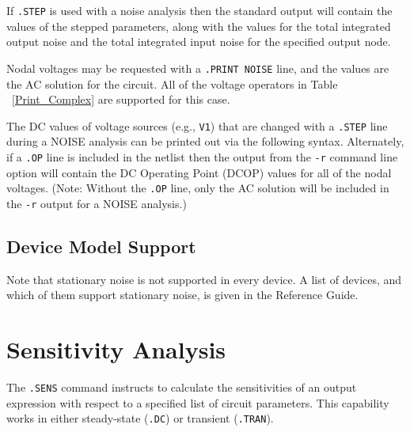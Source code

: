 If \texttt{.STEP} is used with a noise analysis then the \Xyce{} standard output
will contain the values of the stepped parameters, along with the values
for the total integrated output noise and the total integrated input 
noise for the specified output node.

Nodal voltages may be requested with a \verb|.PRINT NOISE| line, and the values 
are the AC solution for the circuit.  All of the voltage operators in 
Table ~\ref{Print_Complex} are supported for this case.

The DC values of voltage sources (e.g., \texttt{V1}) that are changed with 
a \verb|.STEP| line during a NOISE analysis can be printed out via the
following syntax. Alternately, if a \verb|.OP| line is included in the 
netlist then the output from the \verb+-r+ command line option will 
contain the DC Operating Point (DCOP) values for all of the nodal 
voltages.  (Note: Without the \verb|.OP| line, only the AC solution will 
be included in the \verb+-r+ output for a NOISE analysis.) 


\subsection{Device Model Support}

Note that stationary noise is not supported in every \Xyce{} device.
A list of \Xyce{} devices, and which of them support stationary noise, is given 
in the \Xyce{} Reference Guide\ReferenceGuide{}.



\clearpage
\section{Sensitivity Analysis}
\label{SENS_Analysis}
\label{sensitivity_Overview}

The \texttt{.SENS}  command instructs \Xyce{} to calculate
the sensitivities of an output expression with respect 
to a specified list of circuit parameters.   This capability works in either 
steady-state (\texttt{.DC})  or transient (\texttt{.TRAN}).


